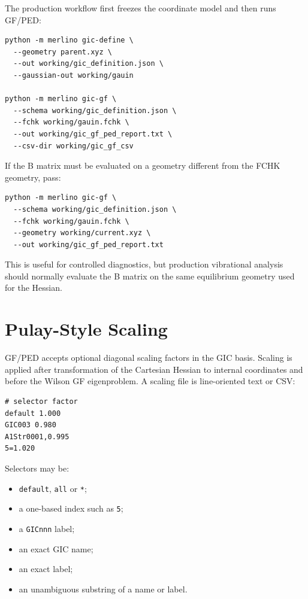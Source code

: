 \documentclass[11pt]{article}
\begin{document}
The production workflow first freezes the coordinate model and then runs GF/PED:

\begin{lstlisting}[style=merlino]
python -m merlino gic-define \
  --geometry parent.xyz \
  --out working/gic_definition.json \
  --gaussian-out working/gauin

python -m merlino gic-gf \
  --schema working/gic_definition.json \
  --fchk working/gauin.fchk \
  --out working/gic_gf_ped_report.txt \
  --csv-dir working/gic_gf_csv
\end{lstlisting}

\noindent
If the B matrix must be evaluated on a geometry different from the FCHK
geometry, pass:

\begin{lstlisting}[style=merlino]
python -m merlino gic-gf \
  --schema working/gic_definition.json \
  --fchk working/gauin.fchk \
  --geometry working/current.xyz \
  --out working/gic_gf_ped_report.txt
\end{lstlisting}

\noindent
This is useful for controlled diagnostics, but production vibrational analysis
should normally evaluate the B matrix on the same equilibrium geometry used for
the Hessian.

\section{Pulay-Style Scaling}

GF/PED accepts optional diagonal scaling factors in the GIC basis.  Scaling is
applied after transformation of the Cartesian Hessian to internal coordinates
and before the Wilson GF eigenproblem.  A scaling file is line-oriented text or
CSV:

\begin{lstlisting}[style=merlino]
# selector factor
default 1.000
GIC003 0.980
A1Str0001,0.995
5=1.020
\end{lstlisting}

\noindent
Selectors may be:

\begin{itemize}
  \item \texttt{default}, \texttt{all} or \texttt{*};
  \item a one-based index such as \texttt{5};
  \item a \texttt{GICnnn} label;
  \item an exact GIC name;
  \item an exact label;
  \item an unambiguous substring of a name or label.
\end{itemize}
\end{document}

